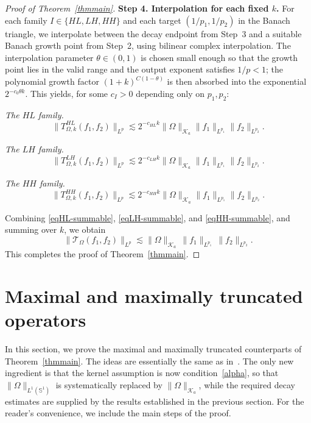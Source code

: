 \documentclass[11pt]{amsart}
\begin{document}
\begin{proof}[Proof of Theorem~\ref{thmmain}]
	\medskip
	\noindent
	\textbf{Step 4. Interpolation for each fixed $k$.}
	For each family $I\in\{HL,LH,HH\}$ and each target $(1/p_1,1/p_2)$ in 
	the Banach triangle, we interpolate between the decay endpoint from 
	Step~3 and a suitable Banach growth point from Step~2, using bilinear 
	complex interpolation. The interpolation parameter $\theta\in(0,1)$ is 
	chosen small enough so that the growth point lies in the valid range and 
	the output exponent satisfies $1/p<1$; the polynomial growth factor 
	$(1+k)^{C(1-\theta)}$ is then absorbed into the exponential $2^{-c_0\theta k}$.
	This yields, for some $c_I>0$ depending only on $p_1,p_2$:
	
	\smallskip
	\noindent\textit{The $HL$ family.}
	\begin{equation}\label{eqHL-summable}
		\|T_{\Omega,k}^{HL}(f_1,f_2)\|_{L^p}
		\lesssim 2^{-c_{HL}k}\|\Omega\|_{\mathcal K_a}
		\|f_1\|_{L^{p_1}}\|f_2\|_{L^{p_2}}.
	\end{equation}
	
	\smallskip
	\noindent\textit{The $LH$ family.}
	\begin{equation}\label{eqLH-summable}
		\|T_{\Omega,k}^{LH}(f_1,f_2)\|_{L^p}
		\lesssim 2^{-c_{LH}k}\|\Omega\|_{\mathcal K_a}
		\|f_1\|_{L^{p_1}}\|f_2\|_{L^{p_2}}.
	\end{equation}
	
	\smallskip
	\noindent\textit{The $HH$ family.}
	\begin{equation}\label{eqHH-summable}
		\|T_{\Omega,k}^{HH}(f_1,f_2)\|_{L^p}
		\lesssim 2^{-c_{HH}k}\|\Omega\|_{\mathcal K_a}
		\|f_1\|_{L^{p_1}}\|f_2\|_{L^{p_2}}.
	\end{equation}
	
	Combining \eqref{eqHL-summable}, \eqref{eqLH-summable}, and \eqref{eqHH-summable}, and summing over \(k\), we obtain
	\[
	\|\mathcal {T}_\Omega(f_1,f_2)\|_{L^p}
	\lesssim
	\|\Omega\|_{\mathcal K_a}\,
	\|f_1\|_{L^{p_1}}\,
	\|f_2\|_{L^{p_2}}.
	\]
	This completes the proof of Theorem~\ref{thmmain}.
\end{proof}

\section{Maximal and maximally truncated operators}\label{secmaximal}

In this section, we prove the maximal and maximally truncated counterparts of Theorem~\ref{thmmain}. The ideas are essentially the same as in~\cite[Theorems~1.5 and~1.7, and Sections~7 and~8]{bhojak2025alternate}. The only new ingredient is that the kernel assumption is now condition~\eqref{alpha}, so that $\|\Omega\|_{L^1(\mathbb S^1)}$ is systematically replaced by $\|\Omega\|_{\mathcal K_a}$, while the required decay estimates are supplied by the results established in the previous section. For the reader's convenience, we include the main steps of the proof.
\end{document}
